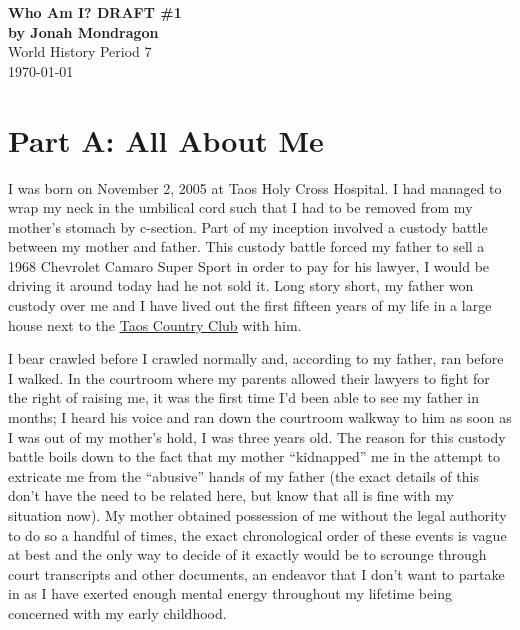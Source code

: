 \documentclass[12pt]{article}
\begin{document}
\doublespacing

\begin{titlepage}
    \begin{center}
        \vspace*{1.5in}
        {\huge\bfseries{Who Am I? DRAFT \#1}}\\
            {\bfseries{by Jonah Mondragon}}\\
            World History Period 7\\
            \today
    \end{center}
\end{titlepage}

\section*{Part A: All About Me}

I was born on November 2, 2005 at Taos Holy Cross Hospital.
I had managed to wrap my neck in the umbilical cord such that I had to be 
    removed from my mother's stomach by c-section.
Part of my inception involved a custody battle between my mother and father.
This custody battle forced my father to sell a 1968 Chevrolet Camaro Super Sport
    in order to pay for his lawyer, I would be driving it around today had he 
    not sold it.
Long story short, my father won custody over me and I have lived out the first
    fifteen years of my life in a large house next to the {\color{blue}
    \underline{\href{ https://www.taoscountryclub.com/}{Taos Country Club}}}
    with him.

I bear crawled before I crawled normally and, according to my father, ran before
    I walked.
In the courtroom where my parents allowed their lawyers to fight for the right
    of raising me, it was the first time I'd been able to see my father in 
    months; %
    I heard his voice and ran down the courtroom walkway to him as soon as I was
    out of my mother's hold, I was three years old. %
The reason for this custody battle boils down to the fact that my mother
    ``kidnapped'' me in the attempt to extricate me from the ``abusive'' hands
    of my father (the exact details of this don't have the need to be related 
    here, but know that all is fine with my situation now).
My mother obtained possession of me without the legal authority to do so a
    handful of times, the exact chronological order of these events is vague at
    best and the only way to decide of it exactly would be to scrounge through
    court transcripts and other documents, an endeavor that I don't want to
    partake in as I have exerted enough mental energy throughout my lifetime
    being concerned with my early childhood.
\end{document}
